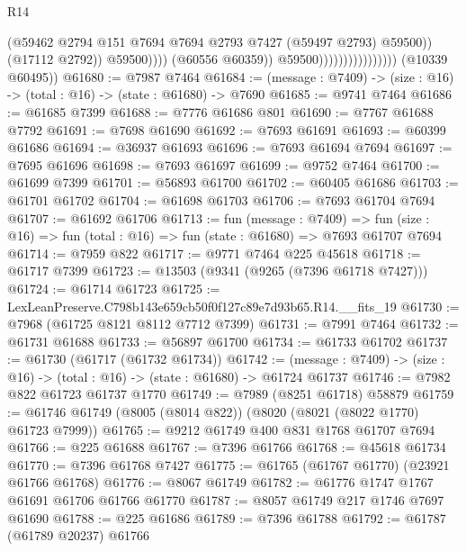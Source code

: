 \begin{lexlean}{R14}
\begin{coremodule}
                                                    (@59462
                                                      @2794
                                                      @151
                                                      @7694
                                                      @7694
                                                      @2793
                                                      @7427
                                                      (@59497 @2793)
                                                      @59500))
                                                  (@17112 @2792))
                                                @59500))))
                                        (@60556 @60359))
                                      @59500))))))))))))))))
      (@10339 @60495))
@61680 := @7987 @7464
@61684 := (message : @7409) -> (size : @16) -> (total : @16) -> (state : @61680) -> @7690
@61685 := @9741 @7464
@61686 := @61685 @7399
@61688 := @7776 @61686 @801
@61690 := @7767 @61688 @7792
@61691 := @7698 @61690
@61692 := @7693 @61691
@61693 := @60399 @61686
@61694 := @36937 @61693
@61696 := @7693 @61694 @7694
@61697 := @7695 @61696
@61698 := @7693 @61697
@61699 := @9752 @7464
@61700 := @61699 @7399
@61701 := @56893 @61700
@61702 := @60405 @61686
@61703 := @61701 @61702
@61704 := @61698 @61703
@61706 := @7693 @61704 @7694
@61707 := @61692 @61706
@61713 := fun (message : @7409) =>
  fun (size : @16) => fun (total : @16) => fun (state : @61680) => @7693 @61707 @7694
@61714 := @7959 @822
@61717 := @9771 @7464 @225 @45618
@61718 := @61717 @7399
@61723 := @13503 (@9341 (@9265 (@7396 @61718 @7427)))
@61724 := @61714 @61723
@61725 := LexLeanPreserve.C798b143e659cb50f0f127c89e7d93b65.R14.__fits_19
@61730 := @7968 (@61725 @8121 @8112 @7712 @7399)
@61731 := @7991 @7464
@61732 := @61731 @61688
@61733 := @56897 @61700
@61734 := @61733 @61702
@61737 := @61730 (@61717 (@61732 @61734))
@61742 := (message : @7409) -> (size : @16) -> (total : @16) -> (state : @61680) -> @61724 @61737
@61746 := @7982 @822 @61723 @61737 @1770
@61749 := @7989 (@8251 @61718) @58879
@61759 := @61746 @61749 (@8005 (@8014 @822)) (@8020 (@8021 (@8022 @1770) @61723 @7999))
@61765 := @9212 @61749 @400 @831 @1768 @61707 @7694
@61766 := @225 @61688
@61767 := @7396 @61766
@61768 := @45618 @61734
@61770 := @7396 @61768 @7427
@61775 := @61765 (@61767 @61770) (@23921 @61766 @61768)
@61776 := @8067 @61749
@61782 := @61776 @1747 @1767 @61691 @61706 @61766 @61770
@61787 := @8057 @61749 @217 @1746 @7697 @61690
@61788 := @225 @61686
@61789 := @7396 @61788
@61792 := @61787 (@61789 @20237) @61766

\end{coremodule}
\end{lexlean}
